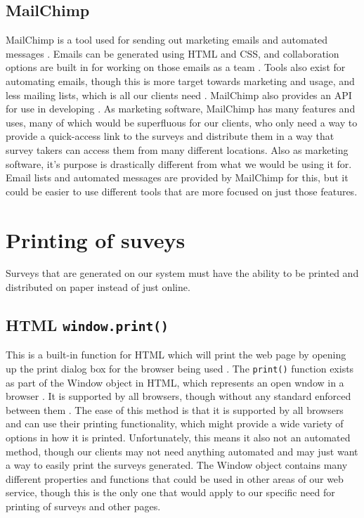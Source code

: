\documentclass{IEEEtran}
\begin{document}
\subsection{MailChimp}
MailChimp is a tool used for sending out marketing emails and automated messages \cite{mailchimp}.
Emails can be generated using HTML and CSS, and collaboration options are built in for working on those emails as a team \cite{mailchimp_features, mailchimp_email}.
Tools also exist for automating emails, though this is more target towards marketing and usage, and less mailing lists, which is all our clients need \cite{mailchimp_features}.
MailChimp also provides an API for use in developing \cite{mailchimp_features}.
As marketing software, MailChimp has many features and uses, many of which would be superfluous for our clients, who only need a way to provide a quick-access link to the surveys and distribute them in a way that survey takers can access them from many different locations.
Also as marketing software, it's purpose is drastically different from what we would be using it for.
Email lists and automated messages are provided by MailChimp for this, but it could be easier to use different tools that are more focused on just those features.

\section{Printing of suveys}
Surveys that are generated on our system must have the ability to be printed and distributed on paper instead of just online.
\subsection{HTML \texttt{window.print()}}
This is a built-in function for HTML which will print the web page by opening up the print dialog box for the browser being used \cite{window_print}.
The \texttt{print()} function exists as part of the Window object in HTML, which represents an open wndow in a browser \cite{window}.
It is supported by all browsers, though without any standard enforced between them \cite{window}.
The ease of this method is that it is supported by all browsers and can use their printing functionality, which might provide a wide variety of options in how it is printed.
Unfortunately, this means it also not an automated method, though our clients may not need anything automated and may just want a way to easily print the surveys generated.
The Window object contains many different properties and functions that could be used in other areas of our web service, though this is the only one that would apply to our specific need for printing of surveys and other pages.
\end{document}
